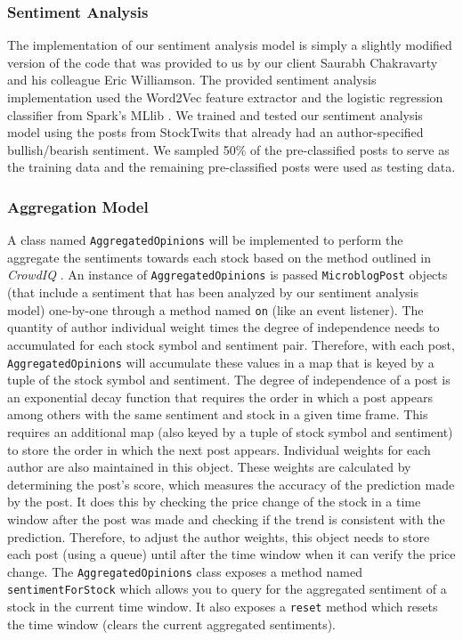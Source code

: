 \subsubsection{Sentiment Analysis}

The implementation of our sentiment analysis model is simply a slightly modified version of the code that was provided to us by our client Saurabh Chakravarty and his colleague Eric Williamson.
The provided sentiment analysis implementation used the Word2Vec feature extractor and the logistic regression classifier from Spark's MLlib \cite{sparkml}.
We trained and tested our sentiment analysis model using the posts from StockTwits that already had an author-specified bullish/bearish sentiment.
We sampled 50\% of the pre-classified posts to serve as the training data and the remaining pre-classified posts were used as testing data.

\subsubsection{Aggregation Model}

A class named \texttt{AggregatedOpinions} will be implemented to perform the aggregate the sentiments towards each stock based on the method outlined in \textit{CrowdIQ} \cite{crowdiq}.
An instance of \texttt{AggregatedOpinions} is passed \texttt{MicroblogPost} objects (that include a sentiment that has been analyzed by our sentiment analysis model) one-by-one through a method named \texttt{on} (like an event listener).
The quantity of author individual weight times the degree of independence needs to accumulated for each stock symbol and sentiment pair.
Therefore, with each post, \texttt{AggregatedOpinions} will accumulate these values in a map that is keyed by a tuple of the stock symbol and sentiment.
The degree of independence of a post is an exponential decay function that requires the order in which a post appears among others with the same sentiment and stock in a given time frame.
This requires an additional map (also keyed by a tuple of stock symbol and sentiment) to store the order in which the next post appears.
Individual weights for each author are also maintained in this object.
These weights are calculated by determining the post's score, which measures the accuracy of the prediction made by the post.
It does this by checking the price change of the stock in a time window after the post was made and checking if the trend is consistent with the prediction.
Therefore, to adjust the author weights, this object needs to store each post (using a queue) until after the time window when it can verify the price change.
The \texttt{AggregatedOpinions} class exposes a method named \texttt{sentimentForStock} which allows you to query for the aggregated sentiment of a stock in the current time window.
It also exposes a \texttt{reset} method which resets the time window (clears the current aggregated sentiments).

